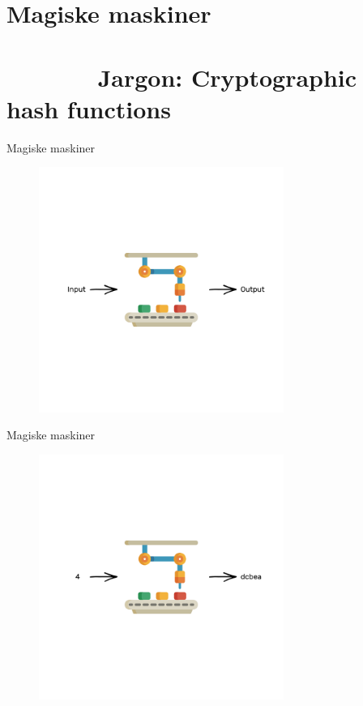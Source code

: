 \documentclass[usenames, dvipsnames]{beamer}
\begin{document}
  \section{Magiske maskiner  \ \ \ \ \ \ \ \ \ \ \ \ \ \ \ \ \ \ \ \ \ \ \ \ \ \ \ \ \ \ \ \ \ \ \ \ \ \ \small Jargon: Cryptographic hash functions}
  \begin{frame}{Magiske maskiner}
    \begin{figure}[ht!]
    \centering
    \includegraphics[width=80mm]{images/magic_machine.png}
    \end{figure}
  \end{frame}
  \begin{frame}{Magiske maskiner}
    \begin{figure}[ht!]
    \centering
    \includegraphics[width=80mm]{images/magic_machine_output1.png}
    \end{figure}
  \end{frame}
\end{document}
